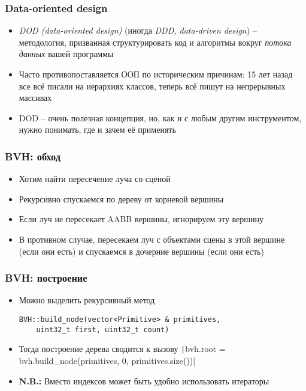 \documentclass[10pt]{beamer}
\begin{document}
\begin{frame}[fragile]
\frametitle{Data-oriented design}
\begin{itemize}
\item \textit{DOD (data-oriented design)} (иногда \textit{DDD, data-driven design}) -- методология, призванная структурировать код и алгоритмы вокруг \textit{потока данных} вашей программы
\pause
\item Часто противопоставляется ООП по историческим причинам: 15 лет назад все всё писали на иерархиях классов, теперь всё пишут на непрерывных массивах
\pause
\item DOD -- очень полезная концепция, но, как и с любым другим инструментом, нужно понимать, где и зачем её применять
\end{itemize}
\end{frame}

\begin{frame}[fragile]
\frametitle{BVH: обход}
\begin{itemize}
\item Хотим найти пересечение луча со сценой
\pause
\item Рекурсивно спускаемся по дереву от корневой вершины
\pause
\item Если луч не пересекает AABB вершины, игнорируем эту вершину
\pause
\item В противном случае, пересекаем луч с объектами сцены в этой вершине (если они есть) и спускаемся в дочерние вершины (если они есть)
\end{itemize}
\end{frame}

\begin{frame}[fragile]
\frametitle{BVH: построение}
\begin{itemize}
\item Можно выделить рекурсивный метод
\begin{verbatim}
BVH::build_node(vector<Primitive> & primitives,
    uint32_t first, uint32_t count)
\end{verbatim}
\pause
\item Тогда построение дерева сводится к вызову
\texttt|bvh.root = bvh.build_node(primitives, 0, primitives.size())|
\pause
\item \textbf{\alert{N.B.:}} Вместо индексов может быть удобно использовать итераторы
\end{itemize}
\end{frame}
\end{document}
